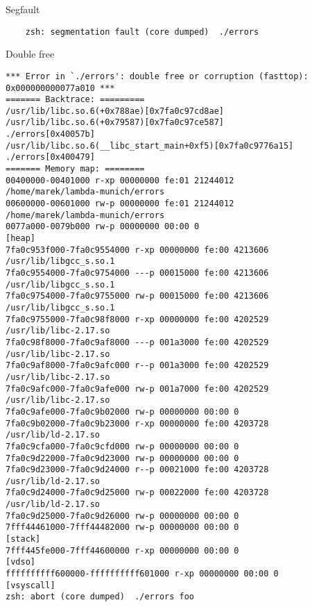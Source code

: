 \documentclass[handout]{beamer}
\begin{document}
\begin{frame}[fragile]{Segfault}
  \begin{verbatim}
    zsh: segmentation fault (core dumped)  ./errors
  \end{verbatim}
\end{frame}

\begin{frame}[fragile]{Double free}
\begin{verbatim}
*** Error in `./errors': double free or corruption (fasttop): 0x000000000077a010 ***
======= Backtrace: =========
/usr/lib/libc.so.6(+0x788ae)[0x7fa0c97cd8ae]
/usr/lib/libc.so.6(+0x79587)[0x7fa0c97ce587]
./errors[0x40057b]
/usr/lib/libc.so.6(__libc_start_main+0xf5)[0x7fa0c9776a15]
./errors[0x400479]
======= Memory map: ========
00400000-00401000 r-xp 00000000 fe:01 21244012                           /home/marek/lambda-munich/errors
00600000-00601000 rw-p 00000000 fe:01 21244012                           /home/marek/lambda-munich/errors
0077a000-0079b000 rw-p 00000000 00:00 0                                  [heap]
7fa0c953f000-7fa0c9554000 r-xp 00000000 fe:00 4213606                    /usr/lib/libgcc_s.so.1
7fa0c9554000-7fa0c9754000 ---p 00015000 fe:00 4213606                    /usr/lib/libgcc_s.so.1
7fa0c9754000-7fa0c9755000 rw-p 00015000 fe:00 4213606                    /usr/lib/libgcc_s.so.1
7fa0c9755000-7fa0c98f8000 r-xp 00000000 fe:00 4202529                    /usr/lib/libc-2.17.so
7fa0c98f8000-7fa0c9af8000 ---p 001a3000 fe:00 4202529                    /usr/lib/libc-2.17.so
7fa0c9af8000-7fa0c9afc000 r--p 001a3000 fe:00 4202529                    /usr/lib/libc-2.17.so
7fa0c9afc000-7fa0c9afe000 rw-p 001a7000 fe:00 4202529                    /usr/lib/libc-2.17.so
7fa0c9afe000-7fa0c9b02000 rw-p 00000000 00:00 0 
7fa0c9b02000-7fa0c9b23000 r-xp 00000000 fe:00 4203728                    /usr/lib/ld-2.17.so
7fa0c9cfa000-7fa0c9cfd000 rw-p 00000000 00:00 0 
7fa0c9d22000-7fa0c9d23000 rw-p 00000000 00:00 0 
7fa0c9d23000-7fa0c9d24000 r--p 00021000 fe:00 4203728                    /usr/lib/ld-2.17.so
7fa0c9d24000-7fa0c9d25000 rw-p 00022000 fe:00 4203728                    /usr/lib/ld-2.17.so
7fa0c9d25000-7fa0c9d26000 rw-p 00000000 00:00 0 
7fff44461000-7fff44482000 rw-p 00000000 00:00 0                          [stack]
7fff445fe000-7fff44600000 r-xp 00000000 00:00 0                          [vdso]
ffffffffff600000-ffffffffff601000 r-xp 00000000 00:00 0                  [vsyscall]
zsh: abort (core dumped)  ./errors foo
\end{verbatim}
\end{frame}
\end{document}
